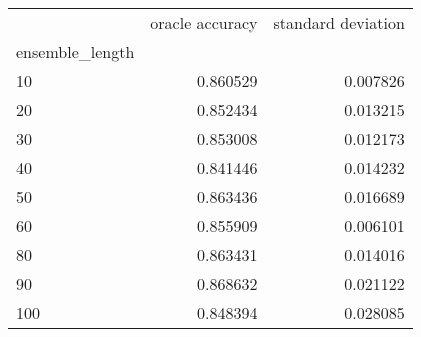 \begin{tabular}{lrr}
\toprule
{} &  oracle accuracy &  standard deviation \\
ensemble\_length &                  &                     \\
\midrule
10              &         0.860529 &            0.007826 \\
20              &         0.852434 &            0.013215 \\
30              &         0.853008 &            0.012173 \\
40              &         0.841446 &            0.014232 \\
50              &         0.863436 &            0.016689 \\
60              &         0.855909 &            0.006101 \\
80              &         0.863431 &            0.014016 \\
90              &         0.868632 &            0.021122 \\
100             &         0.848394 &            0.028085 \\
\bottomrule
\end{tabular}
